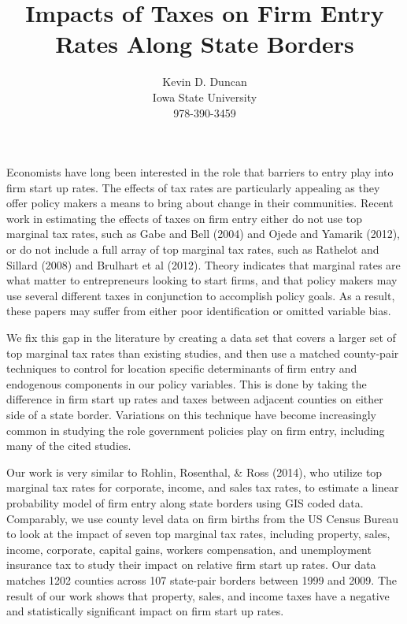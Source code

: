 \documentclass[12 pt,a4paper]{article} %
\date{} %
\begin{document}
\title{Impacts of Taxes on Firm Entry Rates Along State Borders}
\author{Kevin D. Duncan \\ Iowa State University \\ 978-390-3459}
\maketitle

Economists have long been interested in the role that barriers to entry play into firm start up rates. The effects of tax rates are particularly appealing as they offer policy makers a means to bring about change in their communities. Recent work in estimating the effects of taxes on firm entry either do not use top marginal tax rates, such as Gabe and Bell (2004) and Ojede and Yamarik (2012), or do not include a full array of top marginal tax rates, such as Rathelot and Sillard (2008) and Brulhart et al (2012). Theory indicates that marginal rates are what matter to entrepreneurs looking to start firms, and that policy makers may use several different taxes in conjunction to accomplish policy goals. As a result, these papers may suffer from either poor identification or omitted variable bias.

We fix this gap in the literature by creating a data set that covers a larger set of top marginal tax rates than existing studies, and then use a matched county-pair techniques to control for location specific determinants of firm entry and endogenous components in our policy variables. This is done by taking the difference in firm start up rates and taxes between adjacent counties on either side of a state border. Variations on this technique have become increasingly common in studying the role government policies play on firm entry, including many of the cited studies. 

Our work is very similar to Rohlin, Rosenthal, \& Ross (2014), who utilize top marginal tax rates for corporate, income, and sales tax rates, to estimate a linear probability model of firm entry along state borders using GIS coded data. Comparably, we use county level data on firm births from the US Census Bureau to look at the impact of seven top marginal tax rates, including property, sales, income, corporate, capital gains, workers compensation, and unemployment insurance tax to study their impact on relative firm start up rates. Our data matches 1202 counties across 107 state-pair borders between 1999 and 2009. The result of our work shows that property, sales, and income taxes have a negative and statistically significant impact on firm start up rates. 
\end{document}

